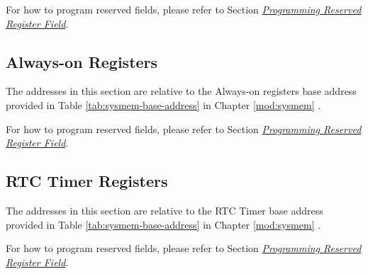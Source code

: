 \documentclass[main\_\_EN.tex]{subfiles}
\begin{document}
For how to program reserved fields, please refer to Section \hyperref[programming-reserved-field]{\textit{Programming Reserved Register Field}}.



\subsection{Always-on Registers}

The addresses in this section are relative to the Always-on registers base address provided in Table \ref{tab:sysmem-base-address} in Chapter \ref{mod:sysmem} \textit{}.

For how to program reserved fields, please refer to Section \hyperref[programming-reserved-field]{\textit{Programming Reserved Register Field}}.



\subsection{RTC Timer Registers}

The addresses in this section are relative to the RTC Timer base address provided in Table \ref{tab:sysmem-base-address} in Chapter \ref{mod:sysmem} \textit{}.

For how to program reserved fields, please refer to Section \hyperref[programming-reserved-field]{\textit{Programming Reserved Register Field}}.


\end{document}
